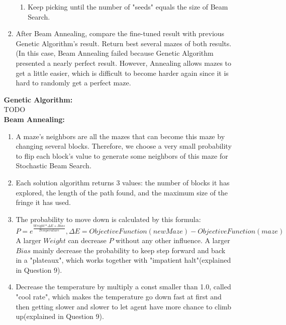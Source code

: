 \documentclass[letter]{article}
\begin{document}
\begin{enumerate}[resume]
\begin{enumerate}
\begin{enumerate}
\begin{enumerate}
					\item {Keep picking until the number of "seeds" equals the size of Beam Search.}
				\end{enumerate}
			
				\item {After Beam Annealing, compare the fine-tuned result with previous Genetic Algorithm's result. Return best several mazes of both results. (In this case, Beam Annealing failed because Genetic Algorithm presented a nearly perfect result. However, Annealing allows mazes to get a little easier, which is difficult to become harder again since it is hard to randomly get a perfect maze.} 
			\end{enumerate} 
		
			\textbf{Genetic Algorithm:} \\
			TODO \\
			
			\textbf{Beam Annealing:} \\
			\begin{enumerate}
				\item {A maze's neighbors are all the mazes that can become this maze by changing several blocks. Therefore, we choose a very small probability to flip each block's value to generate some neighbors of this maze for Stochastic Beam Search.} \\
				
				\item {Each solution algorithm returns 3 values: the number of blocks it has explored, the length of the path found, and the maximum size of the fringe it has used.} \\
				
				\item {The probability to move down is calculated by this formula: $$P = e^{\frac{Weight*\Delta E+Bias}{Temperature}}, \Delta E = ObjectiveFunction(newMaze) - ObjectiveFunction(maze)$$ A larger $Weight$ can decrease $P$ without any other influence. A larger $Bias$ mainly decrease the probability to keep step forward and back in a "plateaux", which works together with "impatient halt"(explained in Question 9).} \\
				
				\item {Decrease the temperature by multiply a const smaller than 1.0, called "cool rate", which makes the temperature go down fast at first and then getting slower and slower to let agent have more chance to climb up(explained in Question 9).} \\
				

\end{enumerate}
\end{enumerate}
\end{enumerate}
\end{document}
